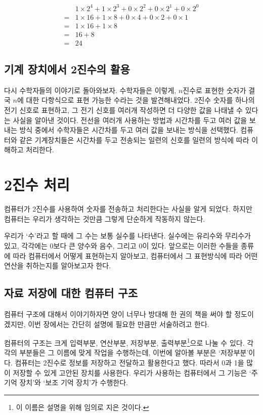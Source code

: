 \documentclass{article}
\begin{document}
$$
\begin{aligned}
     & 1 \times 2^4 + 1 \times 2^3 + 0 \times 2^2 + 0 \times 2^1 + 0 \times 2^0 \\
    =& 1 \times 16 + 1 \times 8 + 0 \times 4 + 0 \times 2 + 0 \times 1 \\
    =& 1 \times 16 + 1 \times 8 \\
    =& 16 + 8 \\
    =& 24
\end{aligned}
$$

\subsection{기계 장치에서 2진수의 활용}

다시 수학자들의 이야기로 돌아와보자. 수학자들은 이렇게, $n$진수로 표현한 숫자가 결국
$n$에 대한 다항식으로 표현 가능한 수라는 것을 발견해내었다. 2진수 숫자를 하나의
전기 신호로 표현하고, 그 전기 신호를 여러개 작성하면 더 다양한 값을 나태낼 수 있다는
사실을 알아낸 것이다. 전선을 여러개 사용하는 방법과 시간차를 두고 여러 값을 보내는
방식 중에서 수학자들은 시간차를 두고 여러 값을 보내는 방식을 선택했다. 컴퓨터와 같은
기계장치들은 시간차를 두고 전송되는 일련의 신호를 일련의 방식에 따라 이해하고 처리한다.

\section{2진수 처리}

컴퓨터가 2진수를 사용하여 숫자를 전송하고 처리한다는 사실을 알게 되었다.
하지만 컴퓨터는 우리가 생각하는 것만큼 그렇게 단순하게 작동하지 않는다.

우리가 `수'라고 할 때에 그 수는 보통 실수를 나타낸다. 실수에는 유리수와 무리수가 있고,
각각에는 0보다 큰 양수와 음수, 그리고 0이 있다. 앞으로는 이러한 수들을 종류에 따라 컴퓨터에서
어떻게 표현하는지 알아보고, 컴퓨터에서 그 표현방식에 따라 어떤 연산을 취하는지를 알아보고자
한다.

\subsection{자료 저장에 대한 컴퓨터 구조}

컴퓨터 구조에 대해서 이야기하자면 양이 너무나 방대해 한 권의 책을 써야 할 정도이겠지만,
이번 장에서는 간단히 설명에 필요한 만큼만 서술하려고 한다.

컴퓨터의 구조는 크게 입력부분, 연산부분, 저장부분, 출력부분\footnote{이 이름은
설명을 위해 임의로 지은 것이다.}으로 나눌 수 있다.
각각의 부분들은 그 이름에 맞게 작업을 수행하는데, 이번에 알아볼 부분은 `저장부분'이다.
컴퓨터는 2진수로 정보를 저장하고 전달하고 활용한다고 했다. 따라서 0과 1을 많이 저장할 수 있게
고안된 장치를 사용한다. 우리가 사용하는 컴퓨터에서 그 기능은 `주 기억 장치'와 `보조 기억 장치'가
수행한다.
\end{document}
